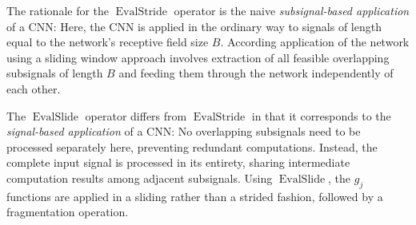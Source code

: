 \documentclass[journal]{IEEEtran}
\DeclareMathOperator{\EvalStride}{EvalStride}
\DeclareMathOperator{\EvalSlide}{EvalSlide}
\begin{document}
The rationale for the $\EvalStride$ operator is the naive \emph{subsignal-based application} of a CNN:
Here, the CNN is applied in the ordinary way to signals of length equal to the network's receptive field size $B$.
According application of the network using a sliding window approach involves extraction of all feasible overlapping subsignals of length $B$ and feeding them through the network independently of each other.

The $\EvalSlide$ operator differs from $\EvalStride$ in that it corresponds to the \emph{signal-based application} of a CNN:
No overlapping subsignals need to be processed separately here, preventing redundant computations.
Instead, the complete input signal is processed in its entirety, sharing intermediate computation results among adjacent subsignals.
Using $\EvalSlide$, the $g_j$ functions are applied in a sliding rather than a strided fashion, followed by a fragmentation operation.
\end{document}
